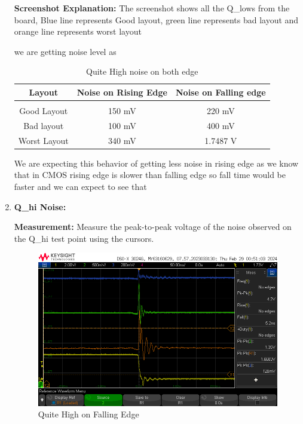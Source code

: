 \documentclass[a4paper,11pt]{article}%
\begin{document}
\begin{enumerate}
\begin{figure}[H]
	\end{figure}

	\textbf{Screenshot Explanation:} The screenshot shows all the Q\_lows from the board, Blue line represents Good layout, green line represents bad layout and orange line represents worst layout 
	
	we are getting noise level as 
	\begin{table}[H]
		\centering
		\begin{tabular}{c c c}
			\hline
			\textbf{Layout}  &  \textbf{Noise on Rising Edge} & \textbf{Noise on Falling edge}              \\\hline
			  &                                       \\
			Good Layout & 150 mV & 220 mV\\
			Bad layout & 100 mV & 400 mV \\
			Worst Layout& 340 mV & 1.7487 V        \\
			
			\hline\hline
		\end{tabular}
		\caption{Quite High noise on both edge}
	\end{table}

	We are expecting this behavior of getting less noise in rising edge as we know that in CMOS rising edge is slower than falling edge so fall time would be faster and we can expect to see that
	\item \textbf{Q\_hi Noise:}
	
	\textbf{Measurement:} Measure the peak-to-peak voltage of the noise observed on the Q\_hi test point using the cursors.

	\begin{figure}[H]
		\centering
		\includegraphics[scale=0.6]{figures/qh_falling}
		\caption{Quite High on Falling Edge}
	

\end{figure}
\end{enumerate}
\end{document}
